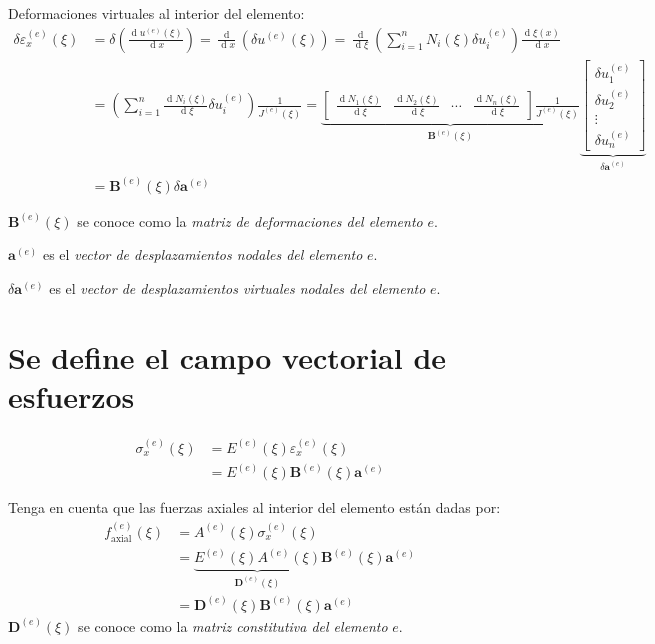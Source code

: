 \documentclass[12pt,letterpaper]{article}
\newcommand{\ve}[1]{{\boldsymbol{#1}}}
\newcommand{\ma}[1]{{\boldsymbol{#1}}}
\newcommand{\dd}{\operatorname{d} \!}
\begin{document}
Deformaciones virtuales al interior del elemento:
\begin{align}
\delta \varepsilon_x^{(e)}(\xi) &= \delta \left(\frac{\dd u^{(e)}(\xi)}{\dd x}\right) = \frac{\dd}{\dd x}\left(\delta u^{(e)}(\xi)\right)
= \frac{\dd}{\dd \xi}\left(\sum_{i=1}^n N_i(\xi) \delta u_i^{(e)}\right)\frac{\dd \xi(x)}{\dd x} \\
&= \left(\sum_{i=1}^n \frac{\dd N_i(\xi)}{\dd \xi} \delta u_i^{(e)}\right)\frac{1}{J^{(e)}(\xi)} = 
\underbrace{\begin{bmatrix}
   \frac{\dd N_1(\xi)}{\dd \xi} & \frac{\dd N_2(\xi)}{\dd \xi} & \cdots & \frac{\dd N_n(\xi)}{\dd \xi}
   \end{bmatrix} \frac{1}{J^{(e)}(\xi)} }_{\ma{B}^{(e)}(\xi)}
\underbrace{\begin{bmatrix}
  \delta u_1^{(e)} \\ \delta u_2^{(e)} \\ \vdots \\ \delta u_n^{(e)} 
   \end{bmatrix}}_{\delta \ma{a}^{(e)}} \\
&= \ma{B}^{(e)}(\xi) \delta \ve{a}^{(e)}
\end{align}

$\ma{B}^{(e)}(\xi)$ se conoce como la \emph{matriz de deformaciones del elemento} $e$.

$\ve{a}^{(e)}$ es el \emph{vector de desplazamientos nodales del elemento} $e$.

$\delta\ve{a}^{(e)}$ es el \emph{vector de desplazamientos virtuales nodales del elemento} $e$.

\newpage
\section{Se define el campo vectorial de esfuerzos}
\begin{align}
\sigma_x^{(e)}(\xi) 
&= E^{(e)}(\xi) \varepsilon_x^{(e)}(\xi) \\
&= E^{(e)}(\xi) \ma{B}^{(e)}(\xi) \ve{a}^{(e)}
\end{align}

Tenga en cuenta que las fuerzas axiales al interior del elemento están dadas por:
\begin{align}
f^{(e)}_{\text{axial}}(\xi) 
&= A^{(e)}(\xi) \sigma_x^{(e)}(\xi) \\
&= \underbrace{E^{(e)}(\xi) A^{(e)}(\xi)}_{\ma{D}^{(e)}(\xi)} \ma{B}^{(e)}(\xi) \ve{a}^{(e)} \\
&= \ma{D}^{(e)}(\xi) \ma{B}^{(e)}(\xi) \ve{a}^{(e)}
\end{align}
$\ma{D}^{(e)}(\xi)$ se conoce como la \emph{matriz constitutiva del elemento} $e$.
\end{document}
